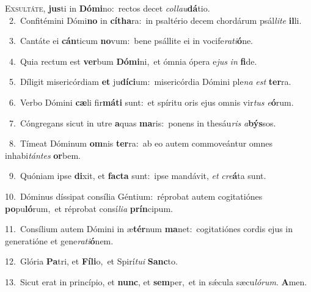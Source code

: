 \lettrine{\initial\textcolor{\initialcolor}{E}}{xsultáte,} \textbf{jus}\-ti in \textbf{Dó}\-\textbf{mi}no:~\star rectos decet \textit{col}\-\textit{lau}\textbf{dá}tio.\\
{\numbfont\textcolor{\numbcolor}{~2.}}~Confitémini Dómi\textbf{no} in \textbf{cí}\-\textbf{tha}ra:~\star in psaltério decem chordárum psál\-\textit{li}\-\textit{te} \textbf{il}\-li.\par
{\numbfont\textcolor{\numbcolor}{~3.}}~Cantáte ei \textbf{cán}\-ticum \textbf{no}\-vum:~\star bene psállite ei in vocife\-\textit{ra}\-\textit{ti}\textbf{ó}ne.\par
{\numbfont\textcolor{\numbcolor}{~4.}}~Quia rectum est \textbf{ver}\-bum \textbf{Dó}\-\textbf{mi}ni,~\star et ómnia ópera e\textit{jus} \textit{in} \textbf{fi}\-de.\par
{\numbfont\textcolor{\numbcolor}{~5.}}~Díligit misericórdiam \textbf{et} ju\-\textbf{dí}\-\textbf{ci}um:~\star misericórdia Dómini ple\textit{na} \textit{est} \textbf{ter}\-ra.\par
{\numbfont\textcolor{\numbcolor}{~6.}}~Verbo Dómini \textbf{cæ}\-li fir\-\textbf{má}\-\textbf{ti} sunt:~\star et spíritu oris ejus omnis vir\textit{tus} \textit{e}\-\textbf{ó}rum.\par
{\numbfont\textcolor{\numbcolor}{~7.}}~Cóngregans sicut in utre \textbf{a}\-quas \textbf{ma}\-ris:~\star ponens in thesáu\textit{ris} \textit{a}\-\textbf{býs}sos.\par
{\numbfont\textcolor{\numbcolor}{~8.}}~Tímeat Dóminum \textbf{om}\-nis \textbf{ter}\-ra:~\star ab eo autem commoveántur omnes inhabi\-\textit{tán}\-\textit{tes} \textbf{or}\-bem.\par
{\numbfont\textcolor{\numbcolor}{~9.}}~Quóniam ipse \textbf{di}\-xit, et \textbf{fac}\-\textbf{ta} sunt:~\star ipse mandávit, \textit{et} \textit{cre}\-\textbf{á}ta sunt.\par
{\numbfont\textcolor{\numbcolor}{10.}}~Dóminus díssipat consília Géntium:~\dagger réprobat autem cogitatiónes \textbf{po}\-pu\-\textbf{ló}\-rum,~\star et réprobat consí\-\textit{li}\-\textit{a} \textbf{prín}\-cipum.\par
{\numbfont\textcolor{\numbcolor}{11.}}~Consílium autem Dómini in æ\-\textbf{tér}\-num \textbf{ma}\-net:~\star cogitatiónes cordis ejus in generatióne et gene\-\textit{ra}\-\textit{ti}\textbf{ó}nem.\par
{\numbfont\textcolor{\numbcolor}{12.}}~Glória \textbf{Pa}\-tri, et \textbf{Fí}\-\textbf{li}o,~\star et Spirí\-\textit{tu}\-\textit{i} \textbf{Sanc}\-to.\par
{\numbfont\textcolor{\numbcolor}{13.}}~Sicut erat in princípio, et \textbf{nunc}\-, et \textbf{sem}\-per,~\star et in sǽcula sæcu\-\textit{ló}\-\textit{rum}. \textbf{A}\-men.\par
